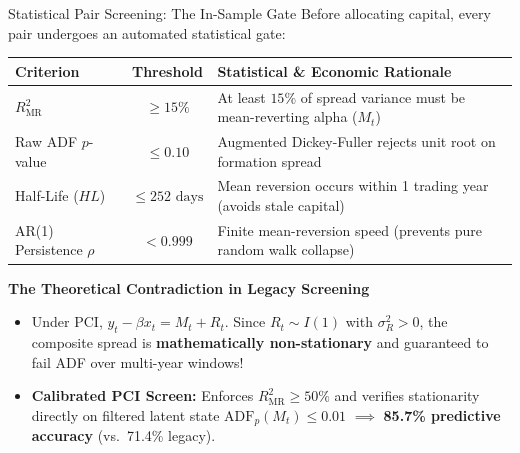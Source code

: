 \documentclass[10pt, aspectratio=169]{beamer}
\begin{document}
\begin{frame}{Statistical Pair Screening: The In-Sample Gate}
  Before allocating capital, every pair undergoes an automated statistical gate:
  \vspace{4pt}
  \begin{table}
    \centering\small
    \begin{tabular}{@{}lcp{7.5cm}@{}}
      \toprule
      \textbf{Criterion} & \textbf{Threshold} & \textbf{Statistical \& Economic Rationale} \\
      \midrule
      $R^2_{\text{MR}}$ & $\ge 15\%$ & At least $15\%$ of spread variance must be mean-reverting alpha ($M_t$) \\
      Raw ADF $p$-value & $\le 0.10$ & Augmented Dickey-Fuller rejects unit root on formation spread \\
      Half-Life ($HL$) & $\le 252\text{ days}$ & Mean reversion occurs within 1 trading year (avoids stale capital) \\
      AR(1) Persistence $\rho$ & $< 0.999$ & Finite mean-reversion speed (prevents pure random walk collapse) \\
      \bottomrule
    \end{tabular}
  \end{table}
  \vspace{4pt}
  \begin{block}{\textbf{The Theoretical Contradiction in Legacy Screening}}
    \begin{itemize}
      \item Under PCI, $y_t - \beta x_t = M_t + R_t$. Since $R_t \sim I(1)$ with $\sigma_R^2 > 0$, the composite spread is \textbf{mathematically non-stationary} and guaranteed to fail ADF over multi-year windows!
      \item \textbf{Calibrated PCI Screen:} Enforces $R^2_{\text{MR}} \ge 50\%$ and verifies stationarity directly on filtered latent state $\text{ADF}_p(M_t) \le 0.01$ $\implies$ \textbf{85.7\% predictive accuracy} (vs.\ 71.4\% legacy).
    \end{itemize}
  \end{block}
\end{frame}
\end{document}
